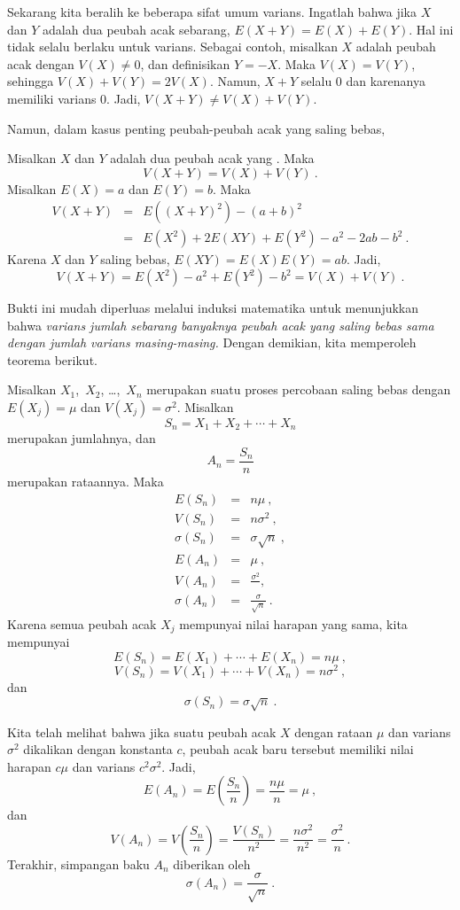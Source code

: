 Sekarang kita beralih ke beberapa sifat umum varians. Ingatlah bahwa jika $X$ dan
$Y$ adalah dua peubah acak sebarang, $E(X + Y) = E(X) + E(Y)$. Hal ini tidak selalu berlaku
untuk varians. Sebagai contoh, misalkan $X$ adalah peubah acak dengan
$V(X) \ne 0$, dan definisikan $Y = -X$. Maka $V(X) = V(Y)$, sehingga $V(X) + V(Y) =
2V(X)$. Namun,
$X + Y$ selalu 0 dan karenanya memiliki varians 0. Jadi, $V(X + Y) \ne V(X) + V(Y)$.
\par Namun, dalam kasus penting peubah-peubah acak yang saling bebas, 

\begin{theorem}\label{thm 6.8} Misalkan $X$ dan $Y$ adalah dua peubah acak yang . Maka
$$V(X + Y) = V(X) + V(Y)\ .$$
\proof Misalkan $E(X) = a$ dan $E(Y) = b$. Maka
\begin{eqnarray*} V(X + Y) & = & E((X + Y)^2) - (a + b)^2 \\
         & = & E(X^2) + 2E(XY) + E(Y^2) - a^2 - 2ab - b^2\ .
\end{eqnarray*} Karena $X$ dan $Y$ saling bebas, $E(XY) = E(X)E(Y) = ab$. Jadi,
$$ V(X + Y) = E(X^2) - a^2 + E(Y^2) - b^2 = V(X) + V(Y)\ .
$$
\end{theorem}

Bukti ini mudah diperluas melalui induksi matematika untuk menunjukkan bahwa {\em
varians jumlah sebarang banyaknya peubah acak yang saling bebas sama dengan jumlah
varians masing-masing.} Dengan demikian, kita memperoleh teorema berikut.

\begin{theorem}\label{thm 6.9} Misalkan $X_1$,~$X_2$, \dots,~$X_n$ merupakan suatu proses
percobaan saling bebas dengan $E(X_j) =
\mu$ dan $V(X_j) = \sigma^2$. Misalkan
$$ S_n = X_1 + X_2 +\cdots+ X_n
$$ merupakan jumlahnya, dan
$$ A_n = \frac {S_n}n
$$ merupakan rataannya. Maka
\begin{eqnarray*} E(S_n) &=& n\mu\ , \\
V(S_n) &=& n\sigma^2\ , \\ 
\sigma(S_n) &=& \sigma \sqrt{n}\ , \\
E(A_n) &=& \mu\ , \\
V(A_n) &=& \frac {\sigma^2}\ , \\
\sigma(A_n) &=& \frac{\sigma}{\sqrt n}\ .
\end{eqnarray*}
\proof Karena semua peubah acak $X_j$ mempunyai nilai harapan yang sama, kita mempunyai
$$ E(S_n) = E(X_1) +\cdots+ E(X_n) = n\mu\ ,
$$ 
$$ V(S_n) = V(X_1) +\cdots+ V(X_n) = n\sigma^2\ ,
$$
dan
$$\sigma(S_n) = \sigma \sqrt{n}\ .$$

Kita telah melihat bahwa jika suatu peubah acak $X$ dengan rataan $\mu$ dan varians
$\sigma^2$ dikalikan dengan konstanta $c$, peubah acak baru tersebut memiliki nilai harapan $c\mu$ dan
varians $c^2\sigma^2$. Jadi,
$$ E(A_n) = E\left(\frac {S_n}n \right) = \frac {n\mu}n = \mu\ ,
$$ dan
$$ V(A_n) = V\left( \frac {S_n}n \right) = \frac {V(S_n)}{n^2} = \frac
{n\sigma^2}{n^2} = \frac {\sigma^2}n\ .
$$ 
Terakhir, simpangan baku $A_n$ diberikan oleh
$$\sigma(A_n) = \frac {\sigma}{\sqrt n}\ .$$
\end{theorem}


